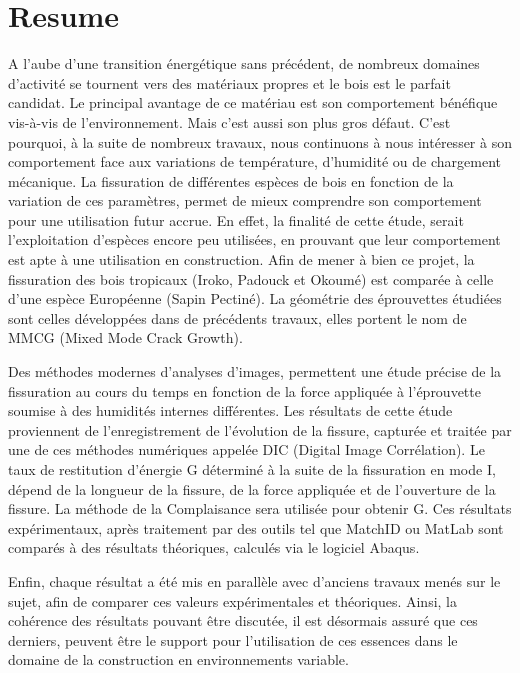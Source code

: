 
\chapter{Resume} %

\label{Resume} %

A l’aube d’une transition énergétique sans précédent, de nombreux domaines d’activité se tournent vers des matériaux propres et le bois est le parfait candidat. Le principal avantage de ce matériau est son comportement bénéfique vis-à-vis de l’environnement. Mais c’est aussi son plus gros défaut. C’est pourquoi, à la suite de nombreux travaux, nous continuons à nous intéresser à son comportement face aux variations de température, d’humidité ou de chargement mécanique. La fissuration de différentes espèces de bois en fonction de la variation de ces paramètres, permet de mieux comprendre son comportement pour une utilisation futur accrue. En effet, la finalité de cette étude, serait l’exploitation d’espèces encore peu utilisées, en prouvant que leur comportement est apte à une utilisation en construction. Afin de mener à bien ce projet, la fissuration des bois tropicaux (Iroko, Padouck et Okoumé) est comparée à celle d’une espèce Européenne (Sapin Pectiné). La géométrie des éprouvettes étudiées sont celles développées dans de précédents travaux, elles portent le nom de MMCG (Mixed Mode Crack Growth).
	
Des méthodes modernes d’analyses d’images, permettent une étude précise de la fissuration au cours du temps en fonction de la force appliquée à l’éprouvette soumise à des humidités internes différentes. Les résultats de cette étude proviennent de l’enregistrement de l’évolution de la fissure, capturée et traitée par une de ces méthodes numériques appelée DIC (Digital Image Corrélation). Le taux de restitution d’énergie G déterminé à la suite de la fissuration en mode I, dépend de la longueur de la fissure, de la force appliquée et de l’ouverture de la fissure. La méthode de la Complaisance sera utilisée pour obtenir G. Ces résultats expérimentaux, après traitement par des outils tel que MatchID ou MatLab sont comparés à des résultats théoriques, calculés via le logiciel Abaqus.
	
Enfin, chaque résultat a été mis en parallèle avec d’anciens travaux menés sur le sujet, afin de comparer ces valeurs expérimentales et théoriques. Ainsi, la cohérence des résultats pouvant être discutée, il est désormais assuré que ces derniers, peuvent être le support pour l’utilisation de ces essences dans le domaine de la construction en environnements variable.